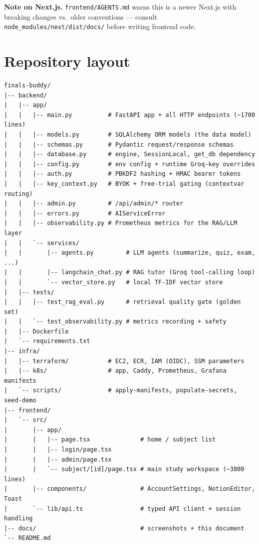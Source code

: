 \documentclass[11pt,a4paper]{article}
\newcommand{\code}[1]{\colorbox{fbCream}{\texttt{\small #1}}}
\begin{document}
\begin{tcolorbox}[colback=fbCream,colframe=fbSage,boxrule=1pt,arc=2pt,left=8pt,right=8pt,top=6pt,bottom=6pt]
\textbf{Note on Next.js.} \code{frontend/AGENTS.md} warns this is a newer Next.js
with breaking changes vs.\ older conventions --- consult
\code{node\_modules/next/dist/docs/} before writing frontend code.
\end{tcolorbox}

\section{Repository layout}

\begin{lstlisting}
finals-buddy/
|-- backend/
|   |-- app/
|   |   |-- main.py          # FastAPI app + all HTTP endpoints (~1700 lines)
|   |   |-- models.py        # SQLAlchemy ORM models (the data model)
|   |   |-- schemas.py       # Pydantic request/response schemas
|   |   |-- database.py      # engine, SessionLocal, get_db dependency
|   |   |-- config.py        # env config + runtime Groq-key overrides
|   |   |-- auth.py          # PBKDF2 hashing + HMAC bearer tokens
|   |   |-- key_context.py   # BYOK + free-trial gating (contextvar routing)
|   |   |-- admin.py         # /api/admin/* router
|   |   |-- errors.py        # AIServiceError
|   |   |-- observability.py # Prometheus metrics for the RAG/LLM layer
|   |   `-- services/
|   |       |-- agents.py         # LLM agents (summarize, quiz, exam, ...)
|   |       |-- langchain_chat.py # RAG tutor (Groq tool-calling loop)
|   |       `-- vector_store.py   # local TF-IDF vector store
|   |-- tests/
|   |   |-- test_rag_eval.py      # retrieval quality gate (golden set)
|   |   `-- test_observability.py # metrics recording + safety
|   |-- Dockerfile
|   `-- requirements.txt
|-- infra/
|   |-- terraform/           # EC2, ECR, IAM (OIDC), SSM parameters
|   |-- k8s/                 # app, Caddy, Prometheus, Grafana manifests
|   `-- scripts/             # apply-manifests, populate-secrets, seed-demo
|-- frontend/
|   `-- src/
|       |-- app/
|       |   |-- page.tsx              # home / subject list
|       |   |-- login/page.tsx
|       |   |-- admin/page.tsx
|       |   `-- subject/[id]/page.tsx # main study workspace (~3800 lines)
|       |-- components/               # AccountSettings, NotionEditor, Toast
|       `-- lib/api.ts                # typed API client + session handling
|-- docs/                             # screenshots + this document
`-- README.md
\end{lstlisting}
\end{document}
